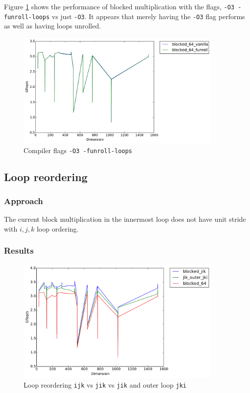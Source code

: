 \documentclass[11pt]{article}
\theoremstyle{plain}
\theoremstyle{definition}
\begin{document}
Figure \ref{funroll_vanilla} shows the performance of blocked multiplication with the flags, \texttt{-O3 -funroll-loops} vs just \texttt{-O3}. It appears that merely having the \texttt{-O3} flag performs as well as having loops unrolled. 
\begin{figure}[H]
    \includegraphics[width=0.9\textwidth]{timing_funroll_vanilla.pdf}
    \caption{Compiler flags \texttt{-O3 -funroll-loops}}
    \label{funroll_vanilla}
\end{figure} 


\subsection{Loop reordering}
\subsubsection{Approach}
The current block multiplication in the innermost loop does not have unit stride with $i, j, k$ loop ordering. 
\subsubsection{Results}

\begin{figure}[H]
    \includegraphics[width=0.9\textwidth]{timing_loop_reorder_fast.pdf}
    \caption{Loop reordering \texttt{ijk} vs \texttt{jik} vs \texttt{jik} and outer loop \texttt{jki}}
    \label{basic_copy_opt}
\end{figure} 
\end{document}
